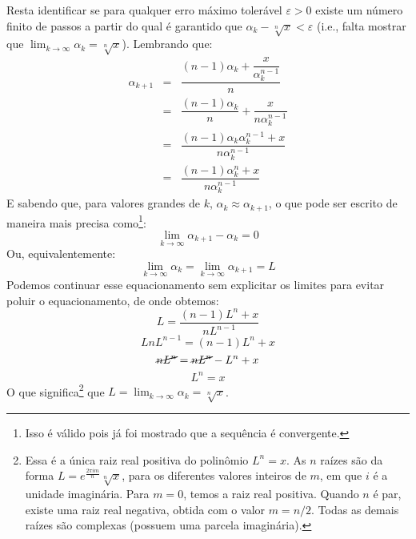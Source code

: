 \documentclass{article}
\begin{document}
Resta identificar
se para qualquer erro máximo tolerável $\varepsilon > 0$
existe um número finito de passos a partir do qual é garantido que
$\alpha_k - \sqrt[n]{x} < \varepsilon$
(i.e., falta mostrar que $\lim_{k\to\infty} \alpha_k = \sqrt[n]{x}$).
Lembrando que:
\[
  \begin{array}{rcl}
  \alpha_{k+1}
  &=& \dfrac{(n-1) \alpha_k + \dfrac{x}{\alpha_k^{n-1}}}{n} \\[5mm]
  &=& \dfrac{(n-1) \alpha_k}{n} + \dfrac{x}{n\alpha_k^{n-1}} \\[5mm]
  &=& \dfrac{(n-1) \alpha_k \alpha_k^{n-1} + x}
            {n\alpha_k^{n-1}} \\[5mm]
  &=& \dfrac{(n-1) \alpha_k^n + x}{n\alpha_k^{n-1}}
  \end{array}
\]
E sabendo que,
para valores grandes de $k$, $\alpha_k \approx \alpha_{k+1}$,
o que pode ser escrito de maneira mais precisa como\footnote{
  Isso é válido pois já foi mostrado que a sequência é convergente.
}:
\[\lim_{k\to\infty} \alpha_{k+1} - \alpha_k = 0\]
Ou, equivalentemente:
\[\lim_{k\to\infty} \alpha_k = \lim_{k\to\infty} \alpha_{k+1} = L\]
Podemos continuar esse equacionamento
sem explicitar os limites para evitar poluir o equacionamento,
de onde obtemos:
\[L = \dfrac{(n-1) L^n + x}{n L^{n-1}}\]
\[L n L^{n-1} = (n-1) L^n + x\]
\[\cancel{nL^n} = \cancel{nL^n} - L^n + x\]
\[L^n = x\]
O que significa\footnote{
  Essa é a única raiz real positiva do polinômio $L^n = x$.
  As $n$ raízes são da forma
  $L = e^{\frac{2\pi i m}{n}} \sqrt[n]{x}$,
  para os diferentes valores inteiros de $m$,
  em que $i$ é a unidade imaginária.
  Para $m = 0$, temos a raiz real positiva.
  Quando $n$ é par, existe uma raiz real negativa,
  obtida com o valor $m = n/2$.
  Todas as demais raízes são complexas
  (possuem uma parcela imaginária).
} que $L = \lim_{k\to\infty} \alpha_k = \sqrt[n]{x}$.


\end{document}
